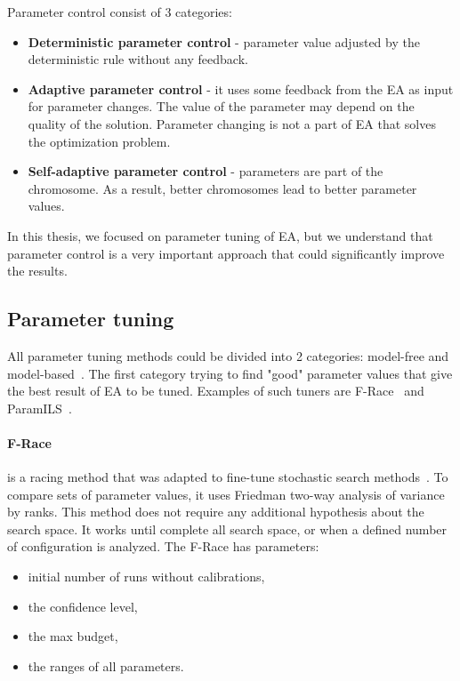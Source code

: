 Parameter control consist of 3 categories:
\begin{itemize}
	\item \textbf{Deterministic parameter control} - parameter value adjusted by the deterministic rule without any feedback. 
	\item \textbf{Adaptive parameter control} - it uses some feedback from the EA as input for parameter changes. The value of the parameter may depend on the quality of the solution. Parameter changing is not a part of EA that solves the optimization problem.
	\item \textbf{Self-adaptive parameter control} - parameters are part of the chromosome. As a result, better chromosomes lead to better parameter values.
\end{itemize}
In this thesis, we focused on parameter tuning of EA, but we understand that parameter control is a very important approach that could significantly improve the results.

\subsection{Parameter tuning}\label{sec:parameterTuning}
All parameter tuning methods could be divided into 2 categories: model-free and model-based~\cite{hutter2010}.
The first category trying to find "good" parameter values that give the best result of EA to be tuned. Examples of such tuners are F-Race~\cite{birattari2010f} and ParamILS~\cite{hutter2009paramils}.

\paragraph{F-Race} is a racing method that was adapted to fine-tune stochastic search methods~\cite{montero2012state}. To compare sets of parameter values, it uses Friedman two-way analysis\cite{theodorsson87} of variance by ranks. This method does not require any additional hypothesis about the search space. It works until complete all search space, or when a defined number of configuration is analyzed. The F-Race has parameters:
\begin{itemize}
	\item initial number of runs without calibrations,
	\item the confidence level,
	\item the max budget,
	\item the ranges of all parameters.
\end{itemize}

